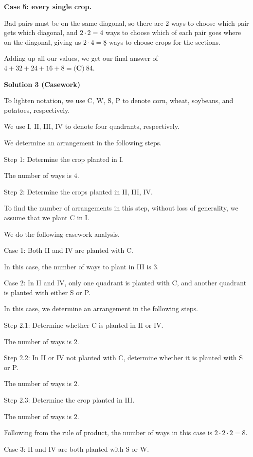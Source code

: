 \begin{enumerate}
 \textbf{Case 5: every single crop.}

 Bad pairs must be on the same diagonal, so there are $2$ ways to choose which pair gets which diagonal, and $2 \cdot 2 = 4$ ways to choose which of each pair goes where on the diagonal, giving us $2 \cdot 4 = \underline{8}$ ways to choose crops for the sections.

 Adding up all our values, we get our final answer of $4+32+24+16+8 = \boxed{\textbf{(C)}\ 84}$.

 



\textbf{Solution 3 (Casework)}

To lighten notation, we use C, W, S, P to denote corn, wheat, soybeans, and potatoes, respectively.

 We use I, II, III, IV to denote four quadrants, respectively.

 We determine an arrangement in the following steps.

 Step 1: Determine the crop planted in I.

 The number of ways is $4$.

 Step 2: Determine the crops planted in II, III, IV.

 To find the number of arrangements in this step, without loss of generality, we assume that we plant C in I.

 We do the following casework analysis.

 Case 1: Both II and IV are planted with C.

 In this case, the number of ways to plant in III is $3$.

 Case 2: In II and IV, only one quadrant is planted with C, and another quadrant is planted with either S or P.

 In this case, we determine an arrangement in the following steps.

 Step 2.1: Determine whether C is planted in II or IV.

 The number of ways is $2$.

 Step 2.2: In II or IV not planted with C, determine whether it is planted with S or P.

 The number of ways is $2$.

 Step 2.3: Determine the crop planted in III.

 The number of ways is $2$.

 Following from the rule of product, the number of ways in this case is $2 \cdot 2 \cdot 2 = 8$.

 Case 3: II and IV are both planted with S or W.


\end{enumerate}
